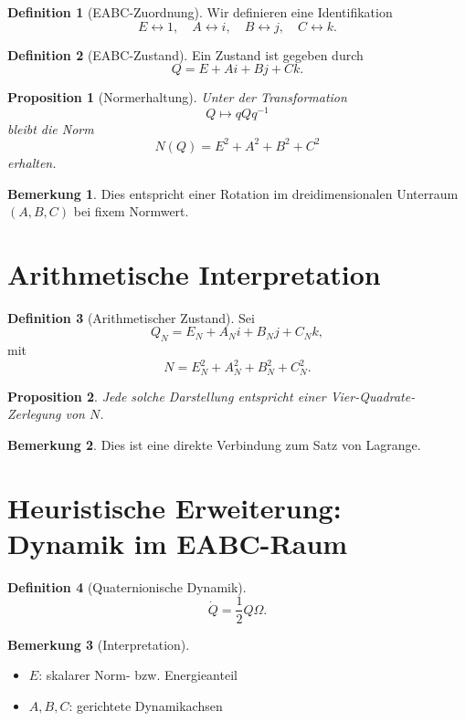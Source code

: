 \documentclass[11pt]{article}
\theoremstyle{definition}
\newtheorem{definition}{Definition}
\newtheorem{remark}{Bemerkung}
\theoremstyle{plain}
\newtheorem{proposition}{Proposition}
\begin{document}
	\begin{definition}[EABC-Zuordnung]
		Wir definieren eine Identifikation
		\[
		E \leftrightarrow 1,\quad A \leftrightarrow i,\quad B \leftrightarrow j,\quad C \leftrightarrow k.
		\]
	\end{definition}
	
	\begin{definition}[EABC-Zustand]
		Ein Zustand ist gegeben durch
		\[
		Q = E + Ai + Bj + Ck.
		\]
	\end{definition}
	
	\begin{proposition}[Normerhaltung]
		Unter der Transformation
		\[
		Q \mapsto q Q q^{-1}
		\]
		bleibt die Norm
		\[
		N(Q) = E^2 + A^2 + B^2 + C^2
		\]
		erhalten.
	\end{proposition}
	
	\begin{remark}
		Dies entspricht einer Rotation im dreidimensionalen Unterraum $(A,B,C)$ bei fixem Normwert.
	\end{remark}
	
	\section{Arithmetische Interpretation}
	
	\begin{definition}[Arithmetischer Zustand]
		Sei
		\[
		Q_N = E_N + A_N i + B_N j + C_N k,
		\]
		mit
		\[
		N = E_N^2 + A_N^2 + B_N^2 + C_N^2.
		\]
	\end{definition}
	
	\begin{proposition}
		Jede solche Darstellung entspricht einer Vier-Quadrate-Zerlegung von $N$.
	\end{proposition}
	
	\begin{remark}
		Dies ist eine direkte Verbindung zum Satz von Lagrange.
	\end{remark}
	
	\section{Heuristische Erweiterung: Dynamik im EABC-Raum}
	
	\begin{definition}[Quaternionische Dynamik]
		\[
		\dot Q = \frac12 Q \Omega.
		\]
	\end{definition}
	
	\begin{remark}[Interpretation]
		\begin{itemize}
			\item $E$: skalarer Norm- bzw. Energieanteil
			\item $A,B,C$: gerichtete Dynamikachsen
		\end{itemize}
	\end{remark}
	
\end{document}
